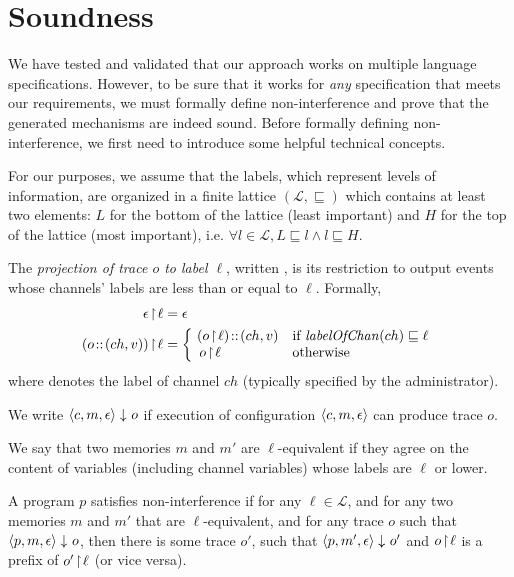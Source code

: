 \documentclass[conference]{IEEEtran}
\begin{document}
\pagebreak
\section{Soundness}\label{section:soundness}
We have tested and validated that our approach works on multiple language specifications. However, to be sure that it works for \emph{any} specification that meets our requirements, we must formally define non-interference and prove that the generated mechanisms are indeed sound. Before formally defining non-interference, we first need to introduce some helpful technical concepts.

For our purposes, we assume that the labels, which represent levels of information, are organized in a finite lattice ${(\mathcal{L},\sqsubseteq)}$ which contains at least two elements: $L$ for the bottom of the lattice (least important) and $H$ for the top of the lattice (most important), i.e. $\forall l \in \mathcal{L}, L \sqsubseteq l \wedge l  \sqsubseteq H$.

The \emph{projection of trace $o$ to label $\ell$}, written , is its restriction  to output events whose channels' labels are less than or equal to $\ell$.  Formally,
\begin{align*}
\proj{\epsilon}{\ell}      & = \epsilon     \\
\proj{(o\!::\!(ch,v))}{\ell} & = \left \{   \begin{array}{ll}
\!(\proj{o}{\ell})\!::\!(ch,v)\!\! &  \text{ if }   \levelOfChan{ch}   \sqsubseteq \ell \\
\proj{o}{\ell}  &   \text{ otherwise}
\end{array} \right.
\end{align*}
where  denotes the label of channel $ch$ (typically specified by the administrator).

We write $\langle c, m, \epsilon \rangle\downarrow_{ }o$ if execution of configuration $\langle c, m, \epsilon \rangle$
can produce trace $o$.

We say that two memories $m$ and $m'$ are $\ell$-equivalent if they agree on the content of variables  (including channel variables) whose labels are $\ell$ or lower.

\begin{definition}
A program $p$ satisfies non-interference if for any $\ell \in \mathcal{L}$, and for any two memories $m$ and $m'$ that are $\ell$-equivalent, and for any trace $o$ such that $\langle p, m, \epsilon \rangle\downarrow_{}o $, then there is some trace $o'$, such that $\langle p, m', \epsilon \rangle\downarrow_{}o'$ and ${o \! \upharpoonright \! {\ell}}$ is a prefix of ${o' \! \upharpoonright \! {\ell}}$ (or vice versa).
\end{definition}
\end{document}

